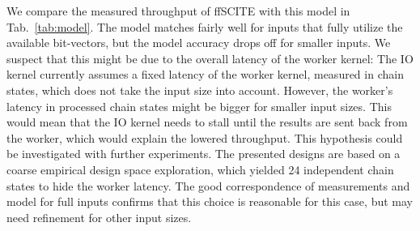 We compare the measured throughput of \ac{ffSCITE} with this model in Tab.~\ref{tab:model}. The model matches fairly well for inputs that fully utilize the available bit-vectors, but the model accuracy drops off for smaller inputs. We suspect that this might be due to the overall latency of the worker kernel: The IO kernel currently assumes a fixed latency of the worker kernel, measured in chain states, which does not take the input size into account. However, the worker's latency in processed chain states might be bigger for smaller input sizes. This would mean that the IO kernel needs to stall until the results are sent back from the worker, which would explain the lowered throughput. This hypothesis could be investigated with further experiments. %
The presented designs are based on a coarse empirical design space exploration, which yielded 24 independent chain states to hide the worker latency.
The good correspondence of measurements and model for full inputs confirms that this choice is reasonable for this case, but may need refinement for other input sizes.
